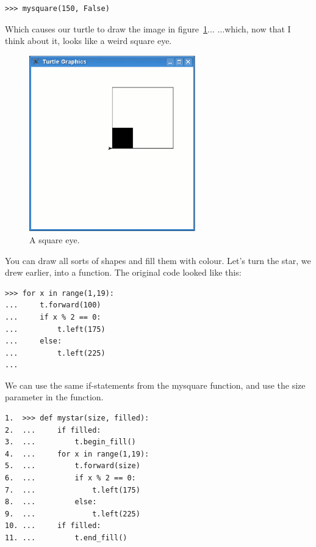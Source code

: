\begin{listing}
\begin{verbatim}
>>> mysquare(150, False)
\end{verbatim}
\end{listing}

\noindent
Which causes our turtle to draw the image in figure~\ref{fig28}$\ldots$ $\ldots$which, now that I think about it, looks like a weird square eye.

\begin{figure}
\begin{center}
\includegraphics[width=72mm]{eps/figure28.eps}
\end{center}
\caption{A square eye.}\label{fig28}
\end{figure}

You can draw all sorts of shapes and fill them with colour. Let's turn the star, we drew earlier, into a function. The original code looked like this:

\begin{listing}
\begin{verbatim}
>>> for x in range(1,19):
...     t.forward(100)
...     if x % 2 == 0:
...         t.left(175)
...     else:
...         t.left(225)
...
\end{verbatim}
\end{listing}

We can use the same if-statements from the mysquare function, and use the size parameter in the  function.

\begin{listing}
\begin{verbatim}
1.  >>> def mystar(size, filled):
2.  ...     if filled:
3.  ...         t.begin_fill()
4.  ...     for x in range(1,19):
5.  ...         t.forward(size)
6.  ...         if x % 2 == 0:
7.  ...             t.left(175)
8.  ...         else:
9.  ...             t.left(225)
10. ...     if filled:
11. ...         t.end_fill()
\end{verbatim}
\end{listing}

